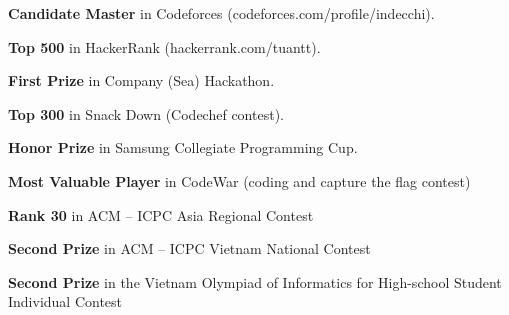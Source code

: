 \begin{cvempty} %
  \begin{cvitems} %
    \item {\textbf{Candidate Master} in Codeforces (codeforces.com/profile/indecchi).}
    \item {\textbf{Top 500} in HackerRank (hackerrank.com/tuantt).}
    \item {\textbf{First Prize} in Company (Sea) Hackathon.\hfill{}}
    \item {\textbf{Top 300} in Snack Down (Codechef contest).\hfill{}}
    \item {\textbf{Honor Prize} in Samsung Collegiate Programming Cup.\hfill{}}
    \item {\textbf{Most Valuable Player} in CodeWar (coding and capture the flag contest)\hfill{}}
    \item {\textbf{Rank 30} in ACM – ICPC Asia Regional Contest\hfill{}}
    \item {\textbf{Second Prize} in ACM – ICPC Vietnam National Contest\hfill{}}
    \item {\textbf{Second Prize} in the Vietnam Olympiad of Informatics for High-school Student Individual Contest\hfill{}}
  \end{cvitems}

\end{cvempty}
